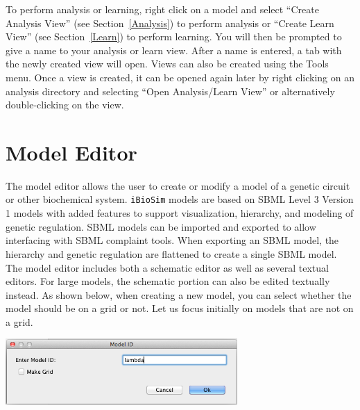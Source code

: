 \documentclass[titlepage,11pt]{article}
\begin{document}


\noindent
To perform analysis or learning, right click on a model and select ``Create Analysis View'' (see Section~\ref{Analysis}) to perform analysis or ``Create Learn View'' (see Section~\ref{Learn}) to perform learning. You will then be prompted to give a name to your analysis or learn view. After a name is entered, a tab with the newly created view will open.  Views can also be created using the Tools menu.  Once a view is created, it can be opened again later by right clicking on an analysis directory and selecting ``Open Analysis/Learn View'' or alternatively double-clicking on the view.


\clearpage

\section{\label{ModelEdit}Model Editor}

\noindent
The model editor allows the user to create or modify a model of a genetic circuit or other biochemical system.  {\tt iBioSim} models are based on SBML Level 3 Version 1 models with added features to support visualization, hierarchy, and modeling of genetic regulation.  SBML models can be imported and exported to allow interfacing with SBML complaint tools.  When exporting an SBML model, the hierarchy and genetic regulation are flattened to create a single SBML model.  The model editor includes both a schematic editor as well as several textual editors.  For large models, the schematic portion can also be edited textually instead.  As shown below, when creating a new model, you can select whether the model should be on a grid or not.  Let us focus initially on models that are not on a grid.

\begin{center}
\includegraphics[height=25mm]{screenshots/ModelId}
\end{center}
\end{document}
